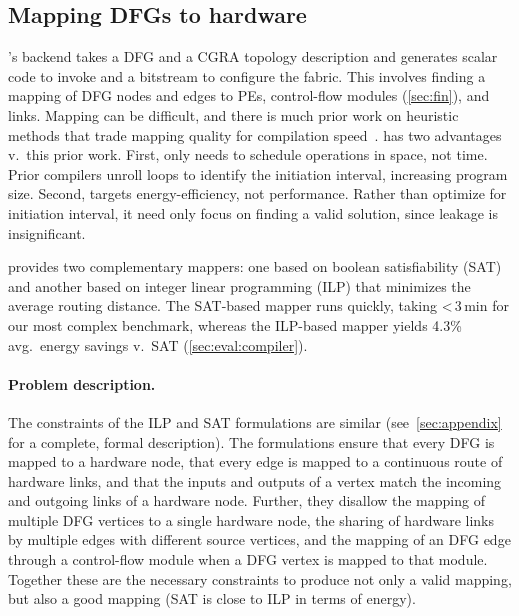 \subsection{Mapping DFGs to hardware}
\label{sec:compiler:map}
\riptidecomp's backend takes a DFG and a CGRA topology description and generates
scalar code to invoke \riptide and a bitstream to configure the \riptide fabric.
% 
This involves finding a mapping of DFG nodes and edges to PEs, control-flow modules (\autoref{sec:fin}), and links.
% 
Mapping can be difficult, and there is much prior work on heuristic methods
that trade mapping quality for compilation speed~\cite{karunaratne2018dnestmap,hamzeh2012epimap,hamzeh2014branch,amp2020,4dcgra,himap,lee2021ultra,chordmap,pathseeker}.
% 
\riptide has two advantages v.\ this prior work.
% 
First, \riptide only needs to schedule operations in space, not time.
%
Prior compilers unroll loops to identify the initiation interval,
increasing program size.
% 
Second, \riptide targets energy-efficiency, not performance.
% 
Rather than optimize for initiation interval, it need only focus on finding a valid solution, since leakage is insignificant. 

\riptide provides two complementary mappers: one based on boolean satisfiability (SAT) and another based on integer linear programming (ILP) that minimizes the average routing distance.
%
The SAT-based mapper runs quickly, taking <\,3\,min for our most complex benchmark,
whereas the ILP-based mapper yields 4.3\% avg.\ energy savings v.\ SAT (\autoref{sec:eval:compiler}).

\paragraph{Problem description.}
The constraints of the ILP and SAT formulations are similar (see~\autoref{sec:appendix} for a complete, formal description).
%
The formulations ensure that every DFG is mapped to a hardware node, that every edge is mapped to a continuous route of hardware links, and that the inputs and outputs of a vertex match the incoming and outgoing links of a hardware node. 
% 
Further, they disallow the mapping of multiple DFG vertices to a single hardware node, the sharing of hardware links by multiple edges with different source vertices, and the mapping of an DFG edge through a control-flow module when a DFG vertex is mapped to that module.
% 
Together these are the necessary constraints to produce not only a valid mapping, but also a good mapping (SAT is close to ILP in terms of energy).
% 
% 


